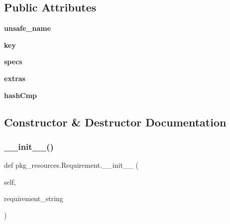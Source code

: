 \subsection*{Public Attributes}
\begin{DoxyCompactItemize}
\item 
\mbox{\label{classpkg__resources_1_1_requirement_ae3d2f6723f48af3c5336b0dc92ea08b3}} 
{\bfseries unsafe\+\_\+name}
\item 
\mbox{\label{classpkg__resources_1_1_requirement_a87c67bd2d8f19575cc4f0a5928b1cea9}} 
{\bfseries key}
\item 
\mbox{\label{classpkg__resources_1_1_requirement_a1fce8b84c1951724bcd1b792a65a1be4}} 
{\bfseries specs}
\item 
\mbox{\label{classpkg__resources_1_1_requirement_a6db71edd7cc700f63b3d0bfa715da67c}} 
{\bfseries extras}
\item 
\mbox{\label{classpkg__resources_1_1_requirement_a13d1c727c4b2101a1db794d9784d9ca4}} 
{\bfseries hash\+Cmp}
\end{DoxyCompactItemize}


\subsection{Constructor \& Destructor Documentation}
\mbox{\label{classpkg__resources_1_1_requirement_aeb1ecd04ffa958c098eaa2b163d06831}} 
\subsubsection{\texorpdfstring{\+\_\+\+\_\+init\+\_\+\+\_\+()}{\_\_init\_\_()}}
{\footnotesize\ttfamily def pkg\+\_\+resources.\+Requirement.\+\_\+\+\_\+init\+\_\+\+\_\+ (\begin{DoxyParamCaption}\item[{}]{self,  }\item[{}]{requirement\+\_\+string }\end{DoxyParamCaption})}

